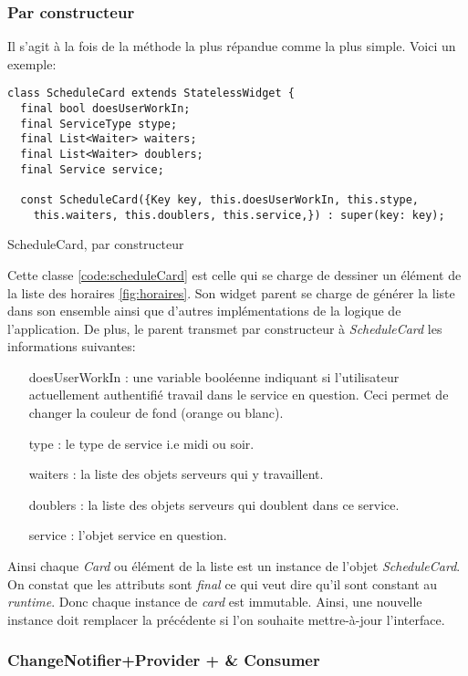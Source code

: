 \subsubsection{Par constructeur}
Il s'agit à la fois de la méthode la plus répandue comme la plus simple. Voici un exemple:

\begin{listing}[h]
    \begin{verbatim}
class ScheduleCard extends StatelessWidget {
  final bool doesUserWorkIn;
  final ServiceType stype;
  final List<Waiter> waiters;
  final List<Waiter> doublers;
  final Service service;
  
  const ScheduleCard({Key key, this.doesUserWorkIn, this.stype,
    this.waiters, this.doublers, this.service,}) : super(key: key);
    \end{verbatim}
    \caption{ScheduleCard, par constructeur}
    \label{code:scheduleCard}
\end{listing}
Cette classe \ref{code:scheduleCard} est celle qui se charge de dessiner un élément de la liste des horaires \ref{fig:horaires}. Son widget parent se charge de générer la liste dans son ensemble ainsi que d'autres implémentations de la logique de l'application. De plus, le parent transmet par constructeur à \textit{ScheduleCard} les informations suivantes:
\smallskip
\begin{itemize}
    \item [doesUserWorkIn] : une variable booléenne indiquant si l'utilisateur actuellement authentifié travail dans le service en question. Ceci permet de changer la couleur de fond (orange ou blanc).
    \item [type] : le type de service i.e midi ou soir.
    \item [waiters]: la liste des objets serveurs qui y travaillent.
    \item [doublers]: la liste des objets serveurs qui doublent dans ce service.
    \item [service]: l'objet service en question.
\end{itemize}
\smallskip

Ainsi chaque \textit{Card} ou élément de la liste est un instance de l'objet \textit{ScheduleCard}. On constat que les attributs sont \textit{final} ce qui veut dire qu'il sont constant au \textit{runtime}. Donc chaque instance de \textit{card} est immutable. Ainsi, une nouvelle instance doit remplacer la précédente si l'on souhaite mettre-à-jour l'interface. 

\subsubsection{ChangeNotifier+Provider +  \& Consumer}

